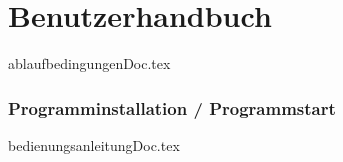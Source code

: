 
\part{Benutzerhandbuch}

{ablaufbedingungenDoc.tex}
\section{Programminstallation / Programmstart}
{bedienungsanleitungDoc.tex}

